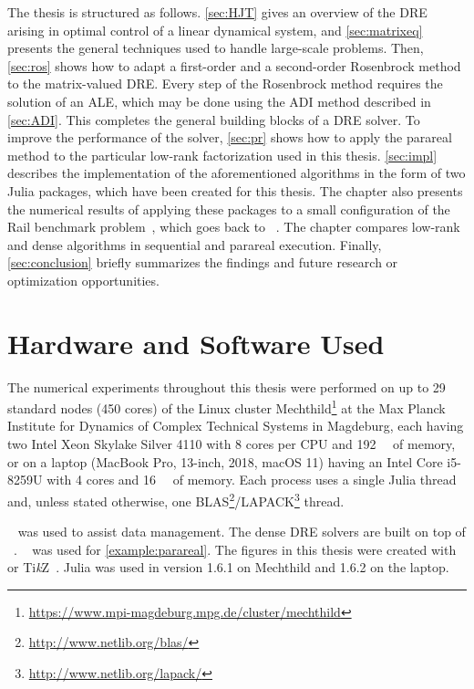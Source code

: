 The thesis is structured as follows.
\autoref{sec:HJT} gives an overview of the \ac{DRE} arising in optimal control of a linear dynamical system,
and \autoref{sec:matrixeq} presents the general techniques used to handle large-scale problems.
Then, \autoref{sec:ros} shows how to adapt a first-order and a second-order Rosenbrock method to the matrix-valued \ac{DRE}.
Every step of the Rosenbrock method requires the solution of an \mbox{\ac{ALE}},
which may be done using \eg the \ac{ADI} method described in \autoref{sec:ADI}.
This completes the general building blocks of a \ac{DRE} solver.
To improve the performance of the solver,
\autoref{sec:pr} shows how to apply the parareal method to the particular low-rank factorization used in this thesis.
\autoref{sec:impl} describes the implementation of the aforementioned algorithms in the form of two Julia packages,
which have been created for this thesis.
The chapter also presents the numerical results of applying these packages to
a small configuration of the Rail benchmark problem~\cite{morwiki_steel},
which goes back to \citeauthor{Benner2005}~\cite{Benner2005}.
The chapter compares low-rank and dense algorithms in sequential and parareal execution.
Finally, \autoref{sec:conclusion} briefly summarizes the findings and future research or optimization opportunities.

\section*{Hardware and Software Used}

The numerical experiments throughout this thesis were performed
on up to 29 standard nodes (450 cores) of the Linux cluster Mechthild\footnote{\url{https://www.mpi-magdeburg.mpg.de/cluster/mechthild}}
at the Max Planck Institute for Dynamics of Complex Technical Systems in Magdeburg,
each having
two Intel Xeon Skylake Silver 4110 with 8 cores per CPU
and \SI{192}{\giga\byte} of memory,
or on a laptop (MacBook Pro, 13-inch, 2018, macOS 11) having
an
Intel Core i5-8259U with 4 cores and \SI{16}{\giga\byte} of memory.
Each process uses a single Julia thread and,
unless stated otherwise, one BLAS\footnote{%
  \url{http://www.netlib.org/blas/}
}/LAPACK\footnote{%
  \url{http://www.netlib.org/lapack/}
} thread.

~\cite{DrWatson} was used to assist data management.
The dense \ac{DRE} solvers are built on top of ~\cite{MatrixEquations}.
~\cite{DifferentialEquations} was used for \autoref{example:parareal}.
The figures in this thesis were created with
~\cite{Makie} or Ti\emph{k}Z~\cite{TikZ}.
Julia was used in version 1.6.1 on Mechthild and 1.6.2 on the laptop.


